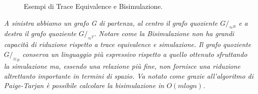 \begin{example}
\begin{figure}[H]
{
}
\caption{Esempi di Trace Equivalence e Bisimulazione.\label{fig:bisim}}
\end{figure}
\begin{center}
\textit{A sinistra abbiamo un grafo G di partenza, al centro il grafo quoziente $G/_{\approx^B}$ e a destra il grafo quoziente $G/_{\approx^T}$. Notare come la Bisimulazione non ha grandi capacità di riduzione rispetto a trace equivalence e simulazione. Il grafo quoziente $G/_{\equiv_B}$ conserva un linguaggio più espressivo rispetto a quello ottenuto sfruttando la simulazione ma, essendo una relazione più fine, non fornisce una riduzione altrettanto importante in termini di spazio. Va notato come grazie all'algoritmo di Paige-Tarjan è possibile calcolare la bisimulazione in $O(mlogn)$.}
\end{center}
\end{example}
